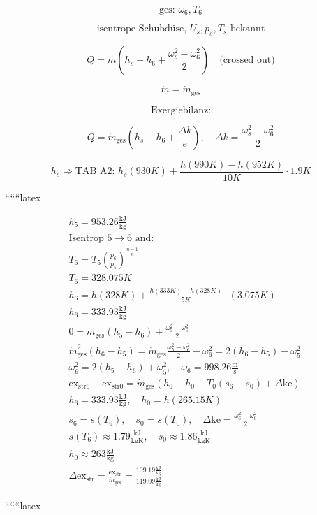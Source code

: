 \[
\text{ges: } \omega_6, T_6
\]

\[
\text{isentrope Schubdüse, } U_s, p_s, T_s \text{ bekannt}
\]

\[
Q = \dot{m} \left( h_s - h_6 + \frac{\omega_s^2 - \omega_6^2}{2} \right) \quad \text{(crossed out)}
\]

\[
\dot{m} = \dot{m}_{\text{ges}}
\]

\[
\text{Exergiebilanz:}
\]

\[
Q = \dot{m}_{\text{ges}} \left( h_s - h_6 + \frac{\Delta k}{e} \right), \quad \Delta k = \frac{\omega_s^2 - \omega_6^2}{2}
\]

\[
h_s \Rightarrow \text{TAB A2: } h_s (930K) + \frac{h(990K) - h(952K)}{10K} \cdot 1.9K
\]

``````latex


\begin{align*}
&h_5 = 953.26 \frac{\text{kJ}}{\text{kg}} \\
&\text{Isentrop } 5 \rightarrow 6 \text{ and:} \\
&T_6 = T_5 \left( \frac{p_6}{p_5} \right)^{\frac{n-1}{n}} \\
&T_6 = 328.075K \\
&h_6 = h(328K) + \frac{h(333K) - h(328K)}{5K} \cdot (3.075K) \\
&h_6 = 333.93 \frac{\text{kJ}}{\text{kg}} \\
&0 = \dot{m}_{\text{ges}} (h_5 - h_6) + \frac{\omega_5^2 - \omega_6^2}{2} \\
&\dot{m}_{\text{ges}}^2 (h_6 - h_5) = \dot{m}_{\text{ges}} \frac{\omega_5^2 - \omega_6^2}{2} - \omega_6^2 = 2(h_6 - h_5) - \omega_5^2 \\
&\omega_6^2 = 2(h_5 - h_6) + \omega_5^2, \quad \omega_6 = 998.26 \frac{\text{m}}{\text{s}} \\
&\text{ex}_{\text{str}6} - \text{ex}_{\text{str}0} = \dot{m}_{\text{ges}} (h_6 - h_0 - T_0 (s_6 - s_0) + \Delta \text{ke}) \\
&h_6 = 333.93 \frac{\text{kJ}}{\text{kg}}, \quad h_0 = h(265.15K) \\
&s_6 = s(T_6), \quad s_0 = s(T_0), \quad \Delta \text{ke} = \frac{\omega_6^2 - \omega_0^2}{2} \\
&s(T_6) \approx 1.79 \frac{\text{kJ}}{\text{kgK}}, \quad s_0 \approx 1.86 \frac{\text{kJ}}{\text{kgK}} \\
&h_0 \approx 263 \frac{\text{kJ}}{\text{kg}} \\
&\Delta \text{ex}_{\text{str}} = \frac{\text{ex}_{\text{str}}}{\dot{m}_{\text{ges}}} = \frac{109.19 \frac{\text{kJ}}{\text{kg}}}{119.09 \frac{\text{kJ}}{\text{kg}}}
\end{align*}

``````latex


